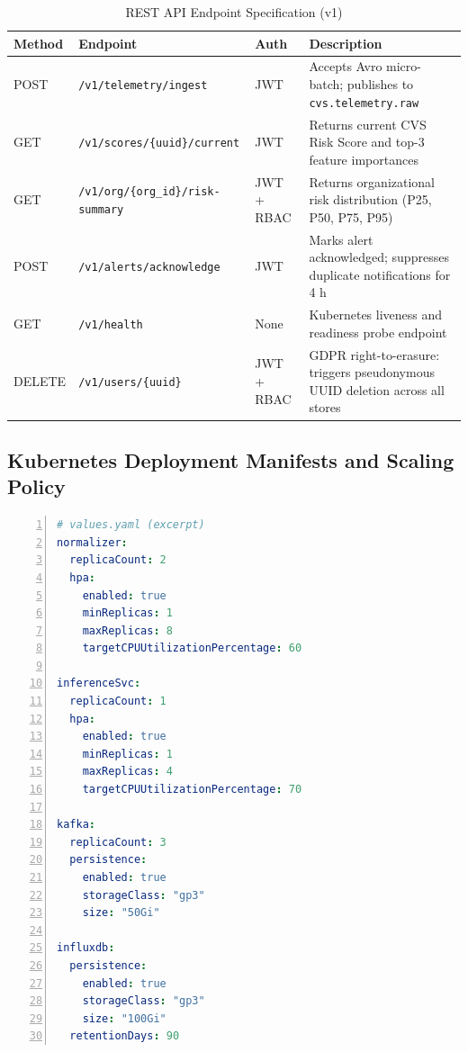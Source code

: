 \documentclass[conference]{IEEEtran}
\begin{document}
\begin{table}[H]
  \centering
  \caption{REST API Endpoint Specification (v1)}
  \label{tab:api}
  \begin{tabularx}{\textwidth}{p{1.3cm} p{5.5cm} p{2.2cm} X}
    \toprule
    \textbf{Method} & \textbf{Endpoint} & \textbf{Auth} & \textbf{Description} \\
    \midrule
    POST & \texttt{/v1/telemetry/ingest}            & JWT &
      Accepts Avro micro-batch; publishes to \texttt{cvs.telemetry.raw} \\
    GET  & \texttt{/v1/scores/\{uuid\}/current}     & JWT &
      Returns current CVS Risk Score and top-3 feature importances \\
    GET  & \texttt{/v1/org/\{org\_id\}/risk-summary} & JWT + RBAC &
      Returns organizational risk distribution (P25, P50, P75, P95) \\
    POST & \texttt{/v1/alerts/acknowledge}           & JWT &
      Marks alert acknowledged; suppresses duplicate notifications for 4 h \\
    GET  & \texttt{/v1/health}                       & None &
      Kubernetes liveness and readiness probe endpoint \\
    DELETE & \texttt{/v1/users/\{uuid\}}             & JWT + RBAC &
      GDPR right-to-erasure: triggers pseudonymous UUID deletion across all stores \\
    \bottomrule
  \end{tabularx}
\end{table}

\subsection{Kubernetes Deployment Manifests and Scaling Policy}

\begin{lstlisting}[language=yaml, caption={Helm Values: HPA and Persistence Configuration},
  basicstyle=\ttfamily\footnotesize, frame=single, numbers=left]
# values.yaml (excerpt)
normalizer:
  replicaCount: 2
  hpa:
    enabled: true
    minReplicas: 1
    maxReplicas: 8
    targetCPUUtilizationPercentage: 60

inferenceSvc:
  replicaCount: 1
  hpa:
    enabled: true
    minReplicas: 1
    maxReplicas: 4
    targetCPUUtilizationPercentage: 70

kafka:
  replicaCount: 3
  persistence:
    enabled: true
    storageClass: "gp3"
    size: "50Gi"

influxdb:
  persistence:
    enabled: true
    storageClass: "gp3"
    size: "100Gi"
  retentionDays: 90
\end{lstlisting}
\end{document}
